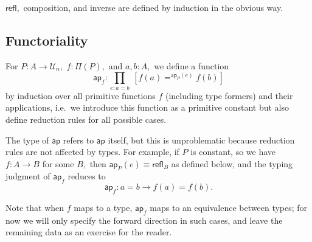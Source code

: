 \documentclass[a4paper]{article}
\theoremstyle{definition}
\theoremstyle{remark}
\let\defeq\equiv
\renewcommand{\equiv}{\simeq}
\newcommand{\pathOver}[1]{=^{#1}}
\newcommand{\univVar}{\mathcal}
\newcommand{\U}{\univVar{U}}
\newcommand{\0}{\primType{0}}
\newcommand{\1}{\primType{1}}
\newcommand{\2}{\primType{2}}
\newcommand{\nm}{\mathsf}
\newcommand{\refl}{\nm{refl}}
\newcommand{\ap}{\nm{ap}}
\begin{document}
$\refl,$ composition, and inverse are defined by induction in the obvious way.

\subsection{Functoriality}

For $P : A \to \U_n,$ $f : \Pi(P),$ and $a,b : A,$ we define a function
\[\ap_f : \prod_{e : a = b}\:[f(a) \pathOver{\ap_P(e)} f(b)]\]
by induction over all primitive functions $f$ (including type formers) and their applications,
i.e.\ we introduce this function as a primitive constant but also define reduction rules for all
possible cases.

The type of $\ap$ refers to $\ap$ itself, but this is unproblematic because reduction rules are not
affected by types. For example, if $P$ is constant, so we have $f : A \to B$ for some $B,$ then
$\ap_P(e) \defeq \refl_B$ as defined below, and the typing judgment of $\ap_f$ reduces to
\[\ap_f : a = b \to f(a) = f(b).\]

Note that when $f$ maps to a type, $\ap_f$ maps to an equivalence between types; for now we will
only specify the forward direction in such cases, and leave the remaining data as an exercise for
the reader.
\end{document}
